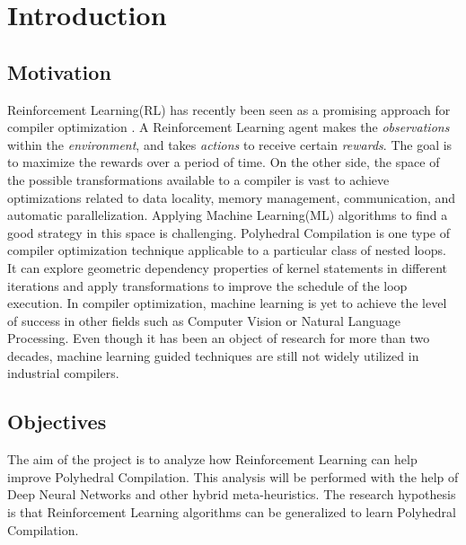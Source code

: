 \documentclass[logo,msc]{infthesis}           %
\begin{document}
\chapter{Introduction}

\section{Motivation}

Reinforcement Learning(RL) has recently been seen as a promising approach for compiler optimization \cite{8357388}\cite{9232934}. A Reinforcement Learning agent makes the \textit{observations} within the \textit{environment}, and takes \textit{actions} to receive certain \textit{rewards}. The goal is to maximize the rewards over a period of time. On the other side, the space of the possible transformations available to a compiler is vast to achieve optimizations related to data locality, memory management, communication, and automatic parallelization. Applying Machine Learning(ML) algorithms to find a good strategy in this space is challenging. Polyhedral Compilation is one type of compiler optimization technique applicable to a particular class of nested loops. It can explore geometric dependency properties of kernel statements in different iterations and apply transformations to improve the schedule of the loop execution. In compiler optimization, machine learning is yet to achieve the level of success in other fields such as Computer Vision or Natural Language Processing. Even though it has been an object of research for more than two decades, machine learning guided techniques are still not widely utilized in industrial compilers.



\section{Objectives}

The aim of the project is to analyze how Reinforcement Learning can help improve Polyhedral Compilation. This analysis will be performed with the help of Deep Neural Networks and other hybrid meta-heuristics. The research hypothesis is that Reinforcement Learning algorithms can be generalized to learn Polyhedral Compilation.
\end{document}

